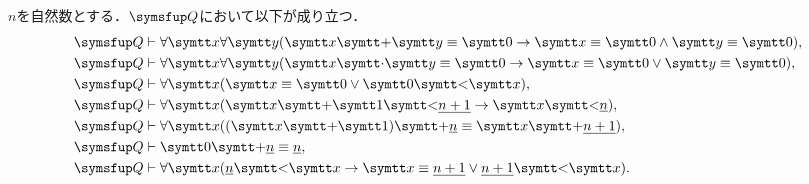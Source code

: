\begin{Lemma} \label{Lemma:Robinsonnumerallemma}
	\(n\)を自然数とする．\(\Robinson\)において以下が成り立つ．
	\begin{align}
		\Robinson & \provable \forall \obj{x} \forall \obj{y} \paren{\obj{x} \obj{+} \obj{y} \objeq \obj{0} \to \obj{x} \objeq \obj{0} \land \obj{y} \objeq \obj{0}},
		\label{eq:Robinsonnumerallemmaadd0}                                                                                                                              \\
		\Robinson & \provable \forall \obj{x} \forall \obj{y} \paren{\obj{x} \obj{\cdot} \obj{y} \objeq \obj{0} \to \obj{x} \objeq \obj{0} \lor \obj{y} \objeq \obj{0}},
		\label{eq:Robinsonnumerallemmacdot0}                                                                                                                             \\
		\Robinson & \provable \forall \obj{x} \paren{\obj{x} \objeq \obj{0} \lor \obj{0} \obj{<} \obj{x}},
		\label{eq:Robinsonnumerallemmaorder}                                                                                                                             \\
		\Robinson & \provable \forall \obj{x} \paren{\obj{x} \obj{+} \obj{1} \obj{<} \numeral{n + 1} \to \obj{x} \obj{<} \numeral{n}},
		\label{eq:Robinsonnumerallemmaordern}                                                                                                                            \\
		\Robinson & \provable \forall \obj{x} \paren{\paren{\obj{x} \obj{+} \obj{1}} \obj{+} \numeral{n} \objeq \obj{x} \obj{+} \numeral{n + 1}},
		\label{eq:Robinsonnumerallemmalinerorderbase}                                                                                                                    \\
		\Robinson & \provable \obj{0} \obj{+} \numeral{n} \objeq \numeral{n},
		\label{eq:Robinsonnumerallemmaadd0commutativelaw}                                                                                                                \\
		\Robinson & \provable \forall \obj{x} \paren{\numeral{n} \obj{<} \obj{x} \to \obj{x} \objeq \numeral{n + 1} \lor \numeral{n + 1} \obj{<} \obj{x}}.
		\label{eq:Robinsonnumerallemmalinerorderbase2}
	\end{align}
\end{Lemma}

